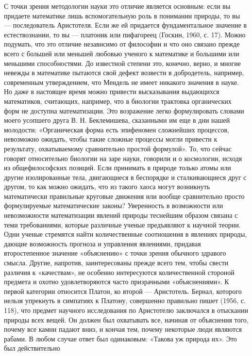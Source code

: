 С точки зрения методологии науки это отличие является основным:
если вы придаете математике лишь вспомогательную роль в понимании
природы, то вы --- последователь Аристотеля. Если же ей придается
фундаментальное значение в естествознании, то вы --- платоник или
пифагореец (Госкин, 1960, с. 17). Можно подумать, что это отличие
независимо от философии и что оно связано прежде всего с большей или
меньшей любовью ученого к математике и большими или меньшими
способностями. До известной степени это, конечно, верно, и многие
невежды в математике пытаются свой дефект возвести в добродетель,
например, современным утверждением, что Мендель не имеет никакого
значения в науке. Но даже в настоящее время можно привести
высказывания выдающихся математиков, считающих, например, что в
биологии трактовка органических форм не доступна математизации. Это
возражение легко формулировать словами моего усопшего друга В. Н.
Беклемишева, сказанными им еще в дни нашей молодости: «Органическая
форма есть эпифеномен сложнейших процессов, невозможно ожидать, чтобы
такие сложные процессы могли привести к результату, охватываемому
сравнительно простой формулой». То, что сейчас говорят относительно
биологии на заре науки, говорили и о космологии, исходя из
общефилософских позиций. Если принимать в природе только атомы или
другие изолированные тела, двигающиеся в беспорядке и сталкивающиеся
друг с другом, то как можно ожидать, что из такого хаоса могут
возникнуть математически правильные круговые движения или вообще
сравнительно просто формулируемые математические законы? Уверенность в
возможности или невозможности математизации явлений природы теснейшим
образом связана с теми требованиями, которые различные ученые
предъявляют к научной теории. Одни ученые стремятся найти
количественные соотношения в явлениях природы, дающие возможность
прогноза и управления явлениями, придавая второстепенное значение
«объяснению» с точки зрения обычного здравого смысла. Другие,
напротив, заинтересованы прежде всего тем, чтобы свести различия к
«качествам», не особенно интересуются количественной стороной предмета
и охотно удовлетворяются часто призрачными «объяснениями». К первой
категории относится Платон, ко второй --- Аристотель. Бернал, которого
нельзя упрекнуть в симпатиях к Платону, совершенно правильно пишет
(1956, с. 118), что предмет научного исследования по Аристотелю
заключался в отыскании природы всех вещей. Он должен был охватывать
все, начиная от объяснения того, почему все камни падают вниз, и
кончая тем, почему некоторые люди являются рабами. В любом случае
ответ был одинаковым: «Такова уж природа их». Это был действительно
